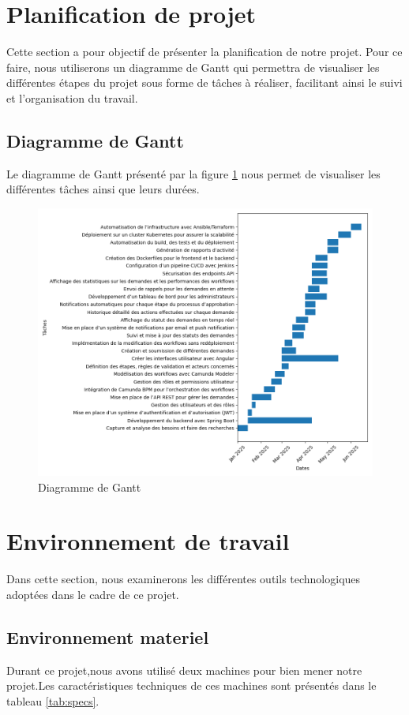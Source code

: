 \section{Planification de projet}
Cette section a pour objectif de présenter la planification de notre projet. Pour ce faire, nous utiliserons un diagramme de Gantt qui permettra de visualiser les différentes étapes du projet sous forme de tâches à réaliser, facilitant ainsi le suivi et l’organisation du travail.
\subsection{Diagramme de Gantt}
Le diagramme de Gantt présenté par la figure \ref{fig:diagantt} nous permet de visualiser les différentes tâches ainsi que leurs durées.
\newpage
\begin{figure}[H]
\vspace*{-1.8cm}
     \centering
  \includegraphics[scale=0.6]{images/gantt.png}
        \caption{Diagramme de Gantt} 
  \label{fig:diagantt}
 \end{figure}

\section{Environnement de travail}
Dans cette section, nous examinerons les différentes outils technologiques adoptées dans le cadre de ce projet.
\subsection{Environnement materiel}
Durant ce projet,nous avons utilisé deux machines pour bien mener notre projet.Les caractéristiques techniques de ces machines sont présentés dans le tableau \ref{tab:specs}.

